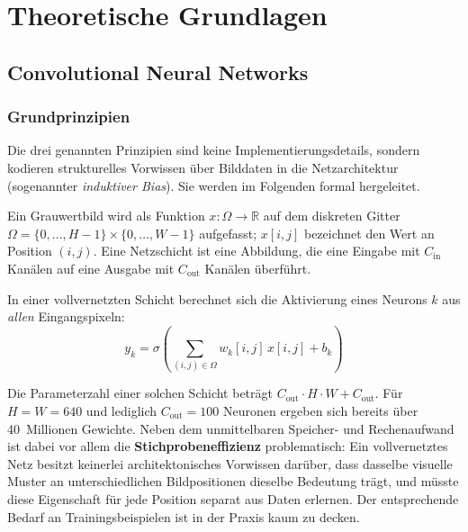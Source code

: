 \chapter{Theoretische Grundlagen}
\label{kap:theorie}

\section{Convolutional Neural Networks}
\label{sec:cnn}

\subsection{Grundprinzipien}
\label{sec:prinzipien}

Die drei genannten Prinzipien sind keine Implementierungsdetails, sondern
kodieren strukturelles Vorwissen über Bilddaten in die Netzarchitektur
(sogenannter \emph{induktiver Bias}). Sie werden im Folgenden formal hergeleitet.

Ein Grauwertbild wird als Funktion $x: \Omega \to \mathbb{R}$
auf dem diskreten Gitter $\Omega = \{0,\dots,H-1\} \times \{0,\dots,W-1\}$
aufgefasst; $x[i,j]$ bezeichnet den Wert an Position $(i,j)$. Eine Netzschicht
ist eine Abbildung, die eine Eingabe mit $C_{\text{in}}$ Kanälen auf eine
Ausgabe mit $C_{\text{out}}$ Kanälen überführt.

 In einer vollvernetzten Schicht berechnet sich
die Aktivierung eines Neurons $k$ aus \emph{allen} Eingangspixeln:
\begin{equation}
y_k = \sigma\!\left(\sum_{(i,j)\in\Omega} w_k[i,j]\,x[i,j] + b_k\right)
\label{eq:fc}
\end{equation}

Die Parameterzahl einer solchen Schicht beträgt
$C_{\text{out}} \cdot H \cdot W + C_{\text{out}}$. Für $H = W = 640$ und
lediglich $C_{\text{out}} = 100$ Neuronen ergeben sich bereits über 40~Millionen
Gewichte. Neben dem unmittelbaren Speicher- und Rechenaufwand ist dabei vor allem
die \textbf{Stichprobeneffizienz} problematisch: Ein vollvernetztes Netz besitzt
keinerlei architektonisches Vorwissen darüber, dass dasselbe visuelle Muster an
unterschiedlichen Bildpositionen dieselbe Bedeutung trägt, und müsste diese
Eigenschaft für jede Position separat aus Daten erlernen. Der entsprechende
Bedarf an Trainingsbeispielen ist in der Praxis kaum zu decken.

